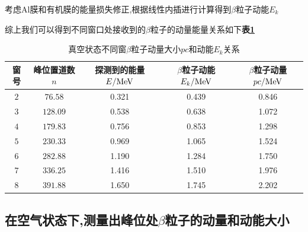 \documentclass[a4paper]{article}
\begin{document}
考虑Al膜和有机膜的能量损失修正,根据线性内插进行计算得到$\beta$粒子动能$E_k$

综上我们可以得到不同窗口处接收到的$\beta$粒子的动量能量关系如下\textbf{表\ref{tab:2}}
\begin{table}[H]
\setlength{\tabcolsep}{3mm}
\caption{真空状态不同窗$\beta$粒子动量大小$pc$和动能$E_k$关系}\label{tab:2}
\begin{center}\begin{tabular}{|c|c|c|c|c|}
	\toprule
	\hline
	\textbf{窗号} & \textbf{峰位置道数$n$} & \textbf{探测到的能量$E/\rm MeV$} & \textbf{$\beta$粒子动能$E_k/\rm MeV$} & \textbf{$\beta$粒子动量$pc/\rm MeV$}\\ \hline \hline
	$2$ & $76.58$ & 0.321 & 0.439 & 0.846\\ \hline
	$3$ & $128.09$ & 0.538 & 0.638 & 1.072\\ \hline
	$4$ & $179.83$ & 0.756 & 0.853 & 1.298\\ \hline
	$5$ & $230.33$ & 0.969 & 1.065 & 1.524\\ \hline
	$6$ & $282.88$ & 1.190 & 1.284 & 1.750\\ \hline
	$7$ & $336.25$ & 1.416 & 1.510 & 1.976\\ \hline
	$8$ & $391.88$ & 1.650 & 1.745 & 2.202\\ \hline
	\bottomrule
	\end{tabular}
\end{center}
\end{table}
\newpage
\subsection{在空气状态下,测量出峰位处$\beta$粒子的动量和动能大小}\label{sub:3}
\end{document}
